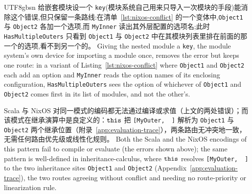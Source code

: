 \begin{CJK*}{UTF8}{gbsn}
\noindent
\ifPaperChinese
给嵌套模块设一个 \texttt{key}(模块系统自己用来只导入一次模块的手段)能消除这个错误,但只保留一条路线:在清单~\ref{lst:nixos-conflict} 的一个变体中,\texttt{Object1} 与 \texttt{Object2} 各加一个选项,而 \texttt{MyInner} 读出其外层配置的选项名;此时 \texttt{HasMultipleOuters} 只看到 \texttt{Object1} 与 \texttt{Object2} 中在其模块列表里排在前面的那一个的选项,看不到另一个的。
\else
Giving the nested module a \texttt{key}, the module system's own device for importing a
module once, removes the error but keeps one route: in a variant of Listing~\ref{lst:nixos-conflict}
where \texttt{Object1} and \texttt{Object2} each add an option and
\texttt{MyInner} reads the option names of its enclosing configuration,
\texttt{HasMultipleOuters} sees the option of whichever of \texttt{Object1} and
\texttt{Object2} comes first in its list of modules, and not the other's.
\fi

\noindent
\ifPaperChinese
Scala 与 NixOS 对同一模式的编码都无法通过编译或求值（上文的两处错误）；而该模式在继承演算中是良定义的：$\mathtt{this}$ 把 \texttt{[MyOuter, ~]} 解析为 \texttt{Object1} 与 \texttt{Object2} 两个继承位置（附录~\ref{app:evaluation-trace}），两条路由无冲突地一致，无需任何路由优先级或线性化规则。
\else
Both the Scala and the NixOS encodings of this pattern fail to compile or
evaluate (the errors shown above); the same pattern is well-defined in
inheritance-calculus, where $\mathtt{this}$ resolves \texttt{[MyOuter, ~]} to
the two inheritance sites \texttt{Object1} and
\texttt{Object2} (Appendix~\ref{app:evaluation-trace}), the two routes
agreeing without conflict and needing no route-priority or linearization rule.
\fi


\end{CJK*}
